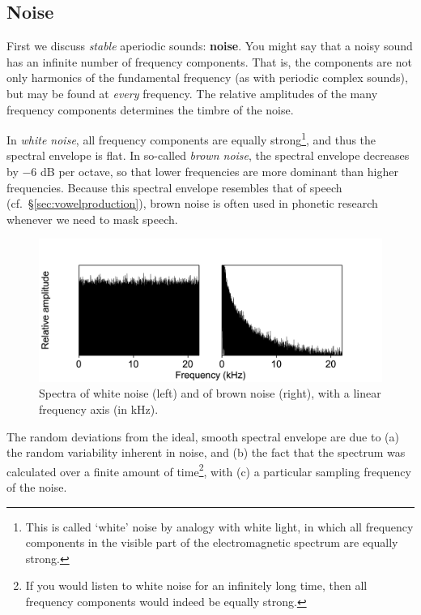\documentclass[
]{book}
\begin{document}
\subsection{Noise}\label{sec:noise}

First we discuss \emph{stable} aperiodic sounds: \textbf{noise}. You might say that a noisy sound has an infinite number of frequency components. That is, the components are not only harmonics of the fundamental frequency (as with periodic complex sounds), but may be found at \emph{every} frequency. The relative amplitudes of the many frequency components determines the timbre of the noise.

In \emph{white noise}, all frequency components are equally strong\footnote{This is called `white' noise by analogy with white light, in which all frequency components in the visible part of the electromagnetic spectrum are equally strong.}, and thus the spectral envelope is flat.
In so-called \emph{brown noise}, the spectral envelope decreases by \(-6\) dB per octave, so that lower frequencies are more dominant than higher frequencies. Because this spectral envelope resembles that of speech (cf.~§\ref{sec:vowelproduction}), brown noise is often used in phonetic research whenever we need to mask speech.

\begin{figure}

{\centering \includegraphics{figures/whitebrownnoises} 

}

\caption{Spectra of white noise (left) and of brown noise (right), with a linear frequency axis (in kHz).}\label{fig:spectrum-whitebrownnoises}
\end{figure}

The random deviations from the ideal, smooth spectral envelope are due to (a) the random variability inherent in noise, and (b) the fact that the spectrum was calculated over a finite amount of time\footnote{If you would listen to white noise for an infinitely long time, then all frequency components would indeed be equally strong.}, with (c) a particular sampling frequency of the noise.
\end{document}
